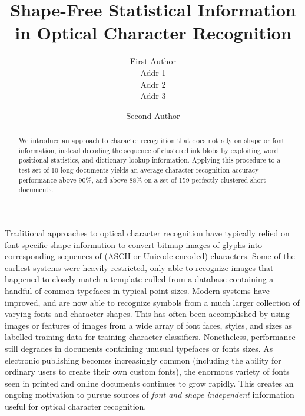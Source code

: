 \documentclass[times, 10pt,twocolumn]{article}
\begin{document}
\title{Shape-Free Statistical Information in Optical Character Recognition}

\author{First Author\\
Addr 1\\
Addr 2\\
Addr 3\\
\and
Second Author\\
}


\maketitle
\thispagestyle{empty}


\begin{abstract}
We introduce an approach to character recognition that does not rely on shape 
or font information, instead decoding the sequence of clustered ink blobs by
exploiting word positional statistics, and dictionary lookup information.
Applying this procedure to a test set of 10 long documents yields an average
character recognition accuracy performance above 90\%, and above 88\% on a set 
of 159 perfectly clustered short documents.
\end{abstract}



Traditional approaches to optical character recognition have typically
relied on font-specific shape information to convert bitmap
images of glyphs into corresponding sequences of (ASCII or Unicode encoded)
characters.  Some of the earliest systems were heavily restricted, only
able to recognize images that happened to closely match a template culled from
a database containing a handful of common typefaces in typical point
sizes.  Modern systems have improved, and are now able to recognize
symbols from a much larger collection of varying fonts and character shapes.  
This has often been accomplished by using images or features of images from a 
wide array of font faces, styles, and sizes as labelled training data for 
training character classifiers.  Nonetheless, performance still degrades
in documents containing unusual typefaces or fonts sizes.  
As electronic publishing becomes increasingly common (including the
ability for ordinary users to create their own custom fonts), the enormous
variety of fonts seen in printed and online documents continues to grow rapidly.
This creates an ongoing motivation to pursue sources of {\em font and shape
independent} information useful for optical character recognition.
\end{document}
